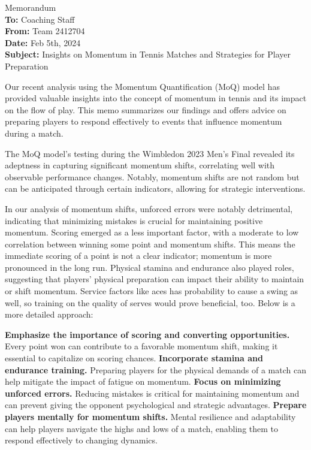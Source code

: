 \documentclass[12pt]{article}  %
\begin{document}
\clearpage
\pagestyle{fancy}
\fancyhead{} %
\begin{letter}{Memorandum}
	\textbf{}\\
	\textbf{To:} Coaching Staff \\
	\textbf{From:} Team 2412704 \\
	\textbf{Date:} Feb 5th, 2024 \\
	\textbf{Subject:} Insights on Momentum in Tennis Matches and Strategies for Player Preparation \\

	\textbf{}
	\begin{multicols}{2}
	Our recent analysis using the Momentum Quantification (MoQ) model has provided valuable insights into the concept of momentum in tennis and its impact on the flow of play. This memo summarizes our findings and offers advice on preparing players to respond effectively to events that influence momentum during a match.
	
	The MoQ model's testing during the Wimbledon 2023 Men's Final revealed its adeptness in capturing significant momentum shifts, correlating well with observable performance changes. Notably, momentum shifts are not random but can be anticipated through certain indicators, allowing for strategic interventions.
	
	In our analysis of momentum shifts, unforced errors were notably detrimental, indicating that minimizing mistakes is crucial for maintaining positive momentum. Scoring emerged as a less important factor, with a moderate to low correlation between winning some point and momentum shifts. This means the immediate scoring of a point is not a clear indicator; momentum is more pronounced in the long run. Physical stamina and endurance also played roles, suggesting that players' physical preparation can impact their ability to maintain or shift momentum. Service factors like aces has probability to cause a swing as well, so training on the quality of serves would prove beneficial, too. Below is a more detailed approach:
	
	\textbf{Emphasize the importance of scoring and converting opportunities.} Every point won can contribute to a favorable momentum shift, making it essential to capitalize on scoring chances.
	\textbf{Incorporate stamina and endurance training.} Preparing players for the physical demands of a match can help mitigate the impact of fatigue on momentum.
	\textbf{Focus on minimizing unforced errors.}  Reducing mistakes is critical for maintaining momentum and can prevent giving the opponent psychological and strategic advantages.
	\textbf{Prepare players mentally for momentum shifts.} Mental resilience and adaptability can help players navigate the highs and lows of a match, enabling them to respond effectively to changing dynamics.
	

\end{multicols}
\end{letter}
\end{document}
